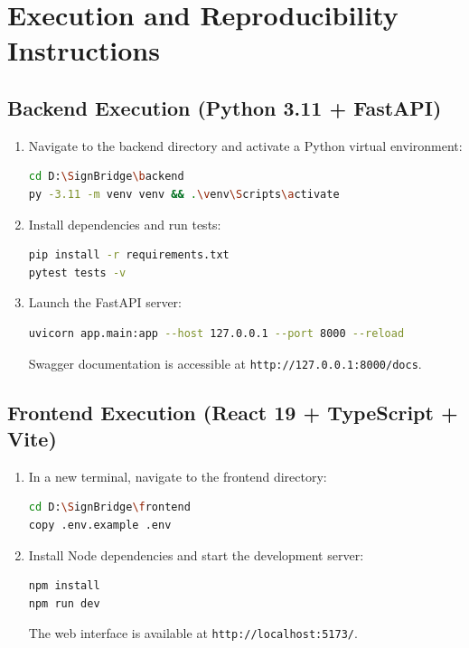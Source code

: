 \section{Execution and Reproducibility Instructions}
\label{sec:app_reproducibility}

\subsection{Backend Execution (Python 3.11 + FastAPI)}
\begin{enumerate}
    \item Navigate to the backend directory and activate a Python virtual environment:
    \begin{lstlisting}[language=bash]
cd D:\SignBridge\backend
py -3.11 -m venv venv && .\venv\Scripts\activate
    \end{lstlisting}
    \item Install dependencies and run tests:
    \begin{lstlisting}[language=bash]
pip install -r requirements.txt
pytest tests -v
    \end{lstlisting}
    \item Launch the FastAPI server:
    \begin{lstlisting}[language=bash]
uvicorn app.main:app --host 127.0.0.1 --port 8000 --reload
    \end{lstlisting}
    Swagger documentation is accessible at \texttt{http://127.0.0.1:8000/docs}.
\end{enumerate}

\subsection{Frontend Execution (React 19 + TypeScript + Vite)}
\begin{enumerate}
    \item In a new terminal, navigate to the frontend directory:
    \begin{lstlisting}[language=bash]
cd D:\SignBridge\frontend
copy .env.example .env
    \end{lstlisting}
    \item Install Node dependencies and start the development server:
    \begin{lstlisting}[language=bash]
npm install
npm run dev
    \end{lstlisting}
    The web interface is available at \texttt{http://localhost:5173/}.
\end{enumerate}
